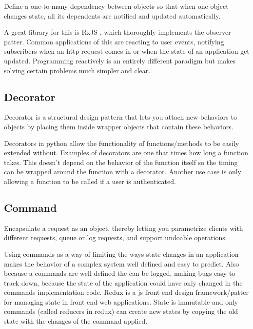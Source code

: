 \documentclass{article}
\begin{document}
\begin{displayquote}
Define a one-to-many dependency between objects so that when one object changes state, all its dependents are notified and updated automatically. \cite{guru}
\end{displayquote}

A great library for this is RxJS \cite{rxjs}, which thoroughly implements the observer patter. Common
applications of this are reacting to user events, notifying subscribers when an http request comes in
or when the state of an application get updated. Programming reactively is an entirely different paradigm
but makes solving certain problems much simpler and clear.

\subsection{Decorator}

\begin{displayquote}
Decorator is a structural design pattern that lets you attach new behaviors to objects by placing them inside wrapper objects that contain these behaviors. \cite{guru}
\end{displayquote}

Decorators in python allow the functionality of functions/methods to be easily extended without. Examples of decorators are one that
times how long a function takes. This doesn't depend on the behavior of the function itself so the timing can be wrapped around the
function with a decorator. Another use case is only allowing a function to be called if a user is authenticated.

\subsection{Command}

\begin{displayquote}
Encapsulate a request as an object, thereby letting you parametrize clients with different requests, queue or log requests, and support undoable operations. \cite{guru}
\end{displayquote}

Using commands as a way of limiting the ways state changes in an application makes the behavior of a complex system well
defined and easy to predict. Also because a commands are well defined the can be logged, making bugs easy to track down,
because the state of the application could have only changed in the commands implementation code. Redux \cite{redux} is a js
front end design framework/patter for managing state in front end web applications. State is immutable and only commands
(called reducers in redux) can create new states by copying the old state with the changes of the command applied.
\end{document}
